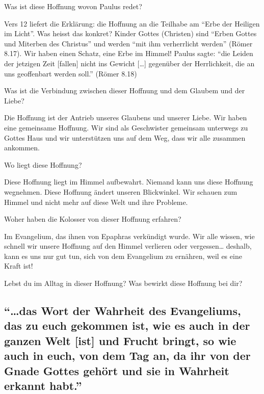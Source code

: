 \documentclass[
  12pt,
]{krantz}
\makeatletter
\newenvironment{kframe}{%
\medskip{}
\setlength{\fboxsep}{.8em}
 \def\at@end@of@kframe{}%
 \ifinner\ifhmode%
  \def\at@end@of@kframe{\end{minipage}}%
  \begin{minipage}{\columnwidth}%
 \fi\fi%
 \def\FrameCommand##1{\hskip\@totalleftmargin \hskip-\fboxsep
 \colorbox{shadecolor}{##1}\hskip-\fboxsep
     \hskip-\linewidth \hskip-\@totalleftmargin \hskip\columnwidth}%
 \MakeFramed {\advance\hsize-\width
   \@totalleftmargin\z@ \linewidth\hsize
   \@setminipage}}%
 {\par\unskip\endMakeFramed%
 \at@end@of@kframe}
\newenvironment{rmdblock}[1]
  {
  \begin{itemize}
  \renewcommand{\labelitemi}{
    \raisebox{-.7\height}[0pt][0pt]{
      {\setkeys{Gin}{width=3em,keepaspectratio}\texttt{[image: img/\#1]}}
    }
  }
  \setlength{\fboxsep}{1em}
  \begin{kframe}
  \item
  }
  {
  \end{kframe}
  \end{itemize}
  }
\newenvironment{rmdquestion}
  {\begin{rmdblock}{question}}
  {\end{rmdblock}}
\makeatother
\begin{document}
Was ist diese Hoffnung wovon Paulus redet?

Vers 12 liefert die Erklärung: die Hoffnung an die Teilhabe am ``Erbe der Heiligen im Licht''. Was heisst das konkret? Kinder Gottes (Christen) sind ``Erben Gottes und Miterben des Christus'' und werden ``mit ihm verherrlicht werden'' (Römer 8.17). Wir haben einen Schatz, eine Erbe im Himmel! Paulus sagte: ``die Leiden der jetzigen Zeit {[}fallen{]} nicht ins Gewicht {[}\ldots{]} gegenüber der Herrlichkeit, die an uns geoffenbart werden soll.'' (Römer 8.18)

Was ist die Verbindung zwischen dieser Hoffnung und dem Glaubem und der Liebe?

Die Hoffnung ist der Antrieb unseres Glaubens und unserer Liebe. Wir haben eine gemeinsame Hoffnung. Wir sind als Geschwister gemeinsam unterwegs zu Gottes Haus und wir unterstützen uns auf dem Weg, dass wir alle zusammen ankommen.

Wo liegt diese Hoffnung?

Diese Hoffnung liegt im Himmel aufbewahrt. Niemand kann uns diese Hoffnung wegnehmen. Diese Hoffnung ändert unseren Blickwinkel. Wir schauen zum Himmel und nicht mehr auf diese Welt und ihre Probleme.

Woher haben die Kolosser von dieser Hoffnung erfahren?

Im Evangelium, das ihnen von Epaphras verkündigt wurde. Wir alle wissen, wie schnell wir unsere Hoffnung auf den Himmel verlieren oder vergessen\ldots{} deshalb, kann es uns nur gut tun, sich von dem Evangelium zu ernähren, weil es eine Kraft ist!

\begin{rmdquestion}
Lebst du im Alltag in dieser Hoffnung? Was bewirkt diese Hoffnung bei
dir?
\end{rmdquestion}

\hypertarget{das-wort-der-wahrheit-des-evangeliums-das-zu-euch-gekommen-ist-wie-es-auch-in-der-ganzen-welt-ist-und-frucht-bringt-so-wie-auch-in-euch-von-dem-tag-an-da-ihr-von-der-gnade-gottes-gehuxf6rt-und-sie-in-wahrheit-erkannt-habt.}{%
\subsection{``\ldots das Wort der Wahrheit des Evangeliums, das zu euch gekommen ist, wie es auch in der ganzen Welt {[}ist{]} und Frucht bringt, so wie auch in euch, von dem Tag an, da ihr von der Gnade Gottes gehört und sie in Wahrheit erkannt habt.''}\label{das-wort-der-wahrheit-des-evangeliums-das-zu-euch-gekommen-ist-wie-es-auch-in-der-ganzen-welt-ist-und-frucht-bringt-so-wie-auch-in-euch-von-dem-tag-an-da-ihr-von-der-gnade-gottes-gehuxf6rt-und-sie-in-wahrheit-erkannt-habt.}}
\end{document}
